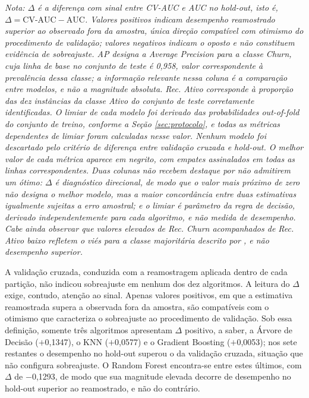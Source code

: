 \begin{table}[htbp]
\begin{flushleft}
	\textit{Nota: $\Delta$ é a diferença com sinal entre CV-AUC e AUC no hold-out, isto é, $\Delta = \textrm{CV-AUC} - \textrm{AUC}$. Valores positivos indicam desempenho reamostrado superior ao observado fora da amostra, única direção compatível com otimismo do procedimento de validação; valores negativos indicam o oposto e não constituem evidência de sobreajuste. AP designa a Average Precision para a classe Churn, cuja linha de base no conjunto de teste é 0,958, valor correspondente à prevalência dessa classe; a informação relevante nessa coluna é a comparação entre modelos, e não a magnitude absoluta. Rec. Ativo corresponde à proporção das dez instâncias da classe Ativo do conjunto de teste corretamente identificadas. O limiar de cada modelo foi derivado das probabilidades out-of-fold do conjunto de treino, conforme a Seção \ref{sec:protocolo}, e todas as métricas dependentes de limiar foram calculadas nesse valor. Nenhum modelo foi descartado pelo critério de diferença entre validação cruzada e hold-out. O melhor valor de cada métrica aparece em negrito, com empates assinalados em todas as linhas correspondentes. Duas colunas não recebem destaque por não admitirem um ótimo: $\Delta$ é diagnóstico direcional, de modo que o valor mais próximo de zero não designa o melhor modelo, mas a maior concordância entre duas estimativas igualmente sujeitas a erro amostral; e o limiar é parâmetro da regra de decisão, derivado independentemente para cada algoritmo, e não medida de desempenho. Cabe ainda observar que valores elevados de Rec. Churn acompanhados de Rec. Ativo baixo refletem o viés para a classe majoritária descrito por , e não desempenho superior.}
\end{flushleft}
\end{table}

A validação cruzada, conduzida com a reamostragem aplicada dentro de cada partição, não indicou sobreajuste em nenhum dos dez algoritmos. A leitura do $\Delta$ exige, contudo, atenção ao sinal. Apenas valores positivos, em que a estimativa reamostrada supera a observada fora da amostra, são compatíveis com o otimismo que caracteriza o sobreajuste ao procedimento de validação. Sob essa definição, somente três algoritmos apresentam $\Delta$ positivo, a saber, a Árvore de Decisão ($+$0,1347), o KNN ($+$0,0577) e o Gradient Boosting ($+$0,0053); nos sete restantes o desempenho no hold-out superou o da validação cruzada, situação que não configura sobreajuste. O Random Forest encontra-se entre estes últimos, com $\Delta$ de $-$0,1293, de modo que sua magnitude elevada decorre de desempenho no hold-out superior ao reamostrado, e não do contrário.


